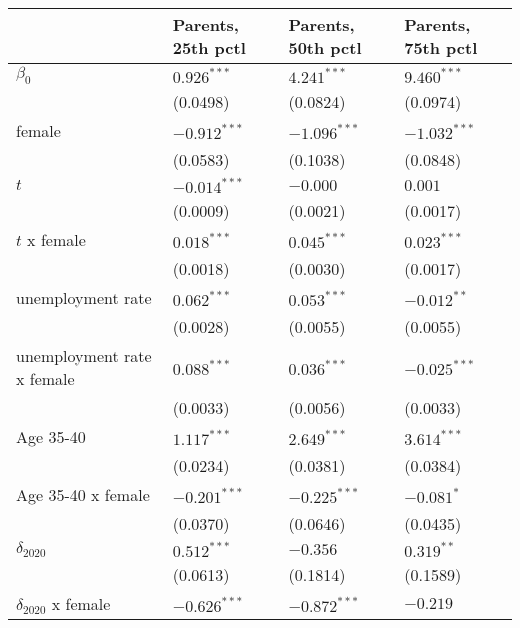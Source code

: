 \begin{tabular}{llll}
\toprule
{} & Parents, 25th pctl & Parents, 50th pctl & Parents, 75th pctl \\
\midrule
$\beta_0$                  &      $0.926^{***}$ &      $4.241^{***}$ &      $9.460^{***}$ \\
                           &           (0.0498) &           (0.0824) &           (0.0974) \\
female                     &     $-0.912^{***}$ &     $-1.096^{***}$ &     $-1.032^{***}$ \\
                           &           (0.0583) &           (0.1038) &           (0.0848) \\
$t$                        &     $-0.014^{***}$ &           $-0.000$ &            $0.001$ \\
                           &           (0.0009) &           (0.0021) &           (0.0017) \\
$t$ x female               &      $0.018^{***}$ &      $0.045^{***}$ &      $0.023^{***}$ \\
                           &           (0.0018) &           (0.0030) &           (0.0017) \\
unemployment rate          &      $0.062^{***}$ &      $0.053^{***}$ &      $-0.012^{**}$ \\
                           &           (0.0028) &           (0.0055) &           (0.0055) \\
unemployment rate x female &      $0.088^{***}$ &      $0.036^{***}$ &     $-0.025^{***}$ \\
                           &           (0.0033) &           (0.0056) &           (0.0033) \\
Age 35-40                  &      $1.117^{***}$ &      $2.649^{***}$ &      $3.614^{***}$ \\
                           &           (0.0234) &           (0.0381) &           (0.0384) \\
Age 35-40 x female         &     $-0.201^{***}$ &     $-0.225^{***}$ &         $-0.081^*$ \\
                           &           (0.0370) &           (0.0646) &           (0.0435) \\
$\delta_{2020}$            &      $0.512^{***}$ &           $-0.356$ &       $0.319^{**}$ \\
                           &           (0.0613) &           (0.1814) &           (0.1589) \\
$\delta_{2020}$ x female   &     $-0.626^{***}$ &     $-0.872^{***}$ &           $-0.219$ \\

\end{tabular}
